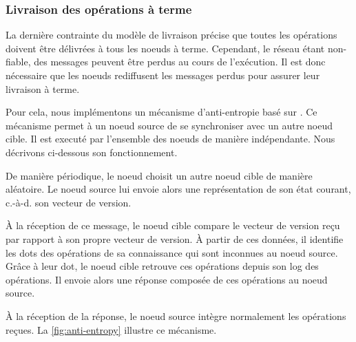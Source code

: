 \documentclass[12pt]{thesul}
\newcommand{\ie}{c.-à-d. }
\begin{document}
\subsubsection{Livraison des opérations à terme}

\label{sec:mute-anti-entropy}

La dernière contrainte du modèle de livraison précise que toutes les opérations doivent être délivrées à tous les noeuds à terme.
Cependant, le réseau étant non-fiable, des messages peuvent être perdus au cours de l'exécution.
Il est donc nécessaire que les noeuds rediffusent les messages perdus pour assurer leur livraison à terme.

Pour cela, nous implémentons un mécanisme d'anti-entropie basé sur \cite{1983-anti-entropy-vv}.
Ce mécanisme permet à un noeud source de se synchroniser avec un autre noeud cible.
Il est executé par l'ensemble des noeuds de manière indépendante.
Nous décrivons ci-dessous son fonctionnement.

De manière périodique, le noeud choisit un autre noeud cible de manière aléatoire.
Le noeud source lui envoie alors une représentation de son état courant, \ie son vecteur de version.

À la réception de ce message, le noeud cible compare le vecteur de version reçu par rapport à son propre vecteur de version.
À partir de ces données, il identifie les dots des opérations de sa connaissance qui sont inconnues au noeud source.
Grâce à leur dot, le noeud cible retrouve ces opérations depuis son log des opérations.
Il envoie alors une réponse composée de ces opérations au noeud source.

À la réception de la réponse, le noeud source intègre normalement les opérations reçues.
La \autoref{fig:anti-entropy} illustre ce mécanisme.
\end{document}
